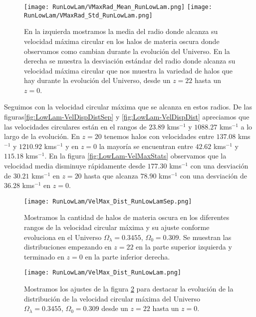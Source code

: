 \begin{figure}[H]
    \centering
    \texttt{[image: RunLowLam/VMaxRad\_Mean\_RunLowLam.png]}
    \texttt{[image: RunLowLam/VMaxRad\_Std\_RunLowLam.png]}
    \caption[Media y desviación estándar del Radio donde se alcanza la velocidad máxima circular]{\footnotesize En la izquierda mostramos la media del radio donde alcanza su velocidad máxima circular en los halos de materia oscura donde observamos como cambian durante la evolución del Universo. En la derecha se muestra la desviación estándar del radio donde alcanza su velocidad máxima circular que nos muestra la variedad de halos que hay durante la evolución del Universo, desde un $z=22$ hasta un $z=0$.}
    \label{fig:LowLam-VMaxRadStats}
\end{figure}

Seguimos con la velocidad circular máxima que se alcanza en estos radios. De las figuras\ref{fig:LowLam-VelDispDistSep} y \ref{fig:LowLam-VelDispDist} apreciamos que las velocidades circulares están en el rangos de $23.89$ kms$^{-1}$ y $1088.27$ kms$^{-1}$ a lo largo de la evolución. En $z=20$ tenemos halos con velocidades entre $137.08$ kms$^{-1}$ y $1210.92$ kms$^{-1}$ y en $z=0$ la mayoría se encuentran entre $42.62$ kms$^{-1}$ y $115.18$ kms$^{-1}$. En la figura \ref{fig:LowLam-VelMaxStats} observamos que la velocidad media disminuye rápidamente desde $177.30$ kms$^{-1}$ con una desviación de $30.21$ kms$^{-1}$ en $z=20$ hasta que alcanza $78.90$ kms$^{-1}$ con una desviación de $36.28$ kms$^{-1}$ en $z=0$.

\begin{figure}[H]
    \centering
    \texttt{[image: RunLowLam/VelMax\_Dist\_RunLowLamSep.png]}
    \caption[Velocidad circular máxima]{\footnotesize Mostramos la cantidad de halos de materia oscura en los diferentes rangos de la velocidad circular máxima y su ajuste conforme evoluciona en el Universo $\Omega_\lambda = 0.3455$, $\Omega_0 = 0.309$. Se muestran las distribuciones empezando en $z=22$ en la parte superior izquierda y terminado en $z=0$ en la parte inferior derecha.}
    \label{fig:LowLam-VelMaxDistSep}
\end{figure}

\begin{figure}[H]
    \centering
    \texttt{[image: RunLowLam/VelMax\_Dist\_RunLowLam.png]}
    \caption[Distribución de la velocidad circular máxima]{\footnotesize Mostramos los ajustes de la figura \ref{fig:LowLam-VelMaxDistSep} para destacar la evolución de la distribución de la velocidad circular máxima del Universo $\Omega_\lambda = 0.3455$, $\Omega_0 = 0.309$ desde un $z=22$ hasta un $z=0$.}
    \label{fig:LowLam-VelMaxDist}
\end{figure}


